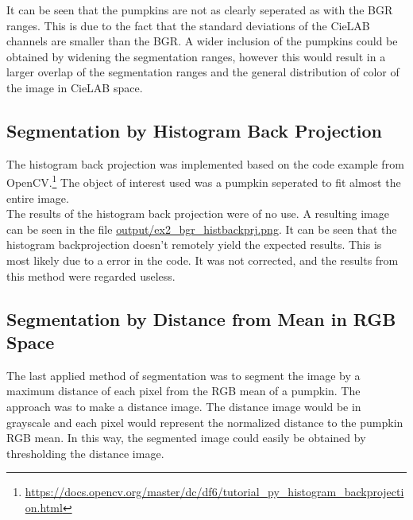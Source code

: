 \documentclass[../Head/Main.tex]{subfiles}
\begin{document}
It can be seen that the pumpkins are not as clearly seperated as with the BGR ranges. This is due to the fact that the standard deviations of the CieLAB channels are smaller than the BGR. A wider inclusion of the pumpkins could be obtained by widening the segmentation ranges, however this would result in a larger overlap of the segmentation ranges and the general distribution of color of the image in CieLAB space.

\subsection{Segmentation by Histogram Back Projection}
The histogram back projection was implemented based on the code example from OpenCV.\footnote{\url{https://docs.opencv.org/master/dc/df6/tutorial_py_histogram_backprojection.html}} The object of interest used was a pumpkin seperated to fit almost the entire image.\\
The results of the histogram back projection were of no use. A resulting image can be seen in the file \url{output/ex2_bgr_histbackprj.png}. It can be seen that the histogram backprojection doesn't remotely yield the expected results. This is most likely due to a error in the code. It was not corrected, and the results from this method were regarded useless.

\subsection{Segmentation by Distance from Mean in RGB Space}
The last applied method of segmentation was to segment the image by a maximum distance of each pixel from the RGB mean of a pumpkin. The approach was to make a distance image. The distance image would be in grayscale and each pixel would represent the normalized distance to the pumpkin RGB mean. In this way, the segmented image could easily be obtained by thresholding the distance image.
\end{document}
